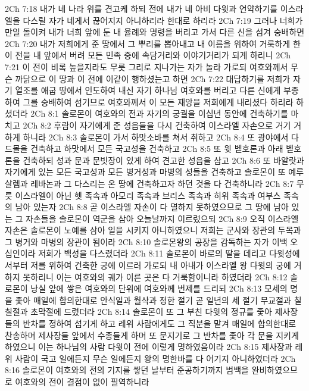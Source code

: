 2Ch 7:18  내가 네 나라 위를 견고케 하되 전에 내가 네 아비 다윗과 언약하기를 이스라엘을 다스릴 자가 네게서 끊어지지 아니하리라 한대로 하리라
2Ch 7:19  그러나 너희가 만일 돌이켜 내가 너희 앞에 둔 내 율례와 명령을 버리고 가서 다른 신을 섬겨 숭배하면
2Ch 7:20  내가 저희에게 준 땅에서 그 뿌리를 뽑아내고 내 이름을 위하여 거룩하게 한 이 전을 내 앞에서 버려 모든 민족 중에 속담거리와 이야기거리가 되게 하리니
2Ch 7:21  이 전이 비록 높을지라도 무릇 그리로 지나가는 자가 놀라 가로되 여호와께서 무슨 까닭으로 이 땅과 이 전에 이같이 행하셨는고 하면
2Ch 7:22  대답하기를 저희가 자기 열조를 애굽 땅에서 인도하여 내신 자기 하나님 여호와를 버리고 다른 신에게 부종하여 그를 숭배하여 섬기므로 여호와께서 이 모든 재앙을 저희에게 내리셨다 하리라 하셨더라
2Ch 8:1  솔로몬이 여호와의 전과 자기의 궁궐을 이십년 동안에 건축하기를 마치고
2Ch 8:2  후람이 자기에게 준 성읍들을 다시 건축하여 이스라엘 자손으로 거기 거하게 하니라
2Ch 8:3  솔로몬이 가서 하맛소바를 쳐서 취하고
2Ch 8:4  또 광야에서 다드몰을 건축하고 하맛에서 모든 국고성을 건축하고
2Ch 8:5  또 윗 벧호론과 아래 벧호론을 건축하되 성과 문과 문빗장이 있게 하여 견고한 성읍을 삼고
2Ch 8:6  또 바알랏과 자기에게 있는 모든 국고성과 모든 병거성과 마병의 성들을 건축하고 솔로몬이 또 예루살렘과 레바논과 그 다스리는 온 땅에 건축하고자 하던 것을 다 건축하니라
2Ch 8:7  무릇 이스라엘이 아닌 헷 족속과 아모리 족속과 브리스 족속과 히위 족속과 여부스 족속의 남아 있는자
2Ch 8:8  곧 이스라엘 자손이 다 멸하지 못하였으므로 그 땅에 남아 있는 그 자손들을 솔로몬이 역군을 삼아 오늘날까지 이르렀으되
2Ch 8:9  오직 이스라엘 자손은 솔로몬이 노예를 삼아 일을 시키지 아니하였으니 저희는 군사와 장관의 두목과 그 병거와 마병의 장관이 됨이라
2Ch 8:10  솔로몬왕의 공장을 감독하는 자가 이백 오십인이라 저희가 백성을 다스렸더라
2Ch 8:11  솔로몬이 바로의 딸을 데리고 다윗성에서부터 저를 위하여 건축한 궁에 이르러 가로되 내 아내가 이스라엘 왕 다윗의 궁에 거하지 못하리니 이는 여호와의 궤가 이른 곳은 다 거룩함이니라 하였더라
2Ch 8:12  솔로몬이 낭실 앞에 쌓은 여호와의 단위에 여호와께 번제를 드리되
2Ch 8:13  모세의 명을 좇아 매일에 합의한대로 안식일과 월삭과 정한 절기 곧 일년의 세 절기 무교절과 칠칠절과 초막절에 드렸더라
2Ch 8:14  솔로몬이 또 그 부친 다윗의 정규를 좇아 제사장들의 반차를 정하여 섬기게 하고 레위 사람에게도 그 직분을 맡겨 매일에 합의한대로 찬송하며 제사장들 앞에서 수종들게 하며 또 문지기로 그 반차를 좇아 각 문을 지키게 하였으니 이는 하나님의 사람 다윗이 전에 이렇게 명하였음이라
2Ch 8:15  제사장과 레위 사람이 국고 일에든지 무슨 일에든지 왕의 명한바를 다 어기지 아니하였더라
2Ch 8:16  솔로몬이 여호와의 전의 기지를 쌓던 날부터 준공하기까지 범백을 완비하였으므로 여호와의 전이 결점이 없이 필역하니라
